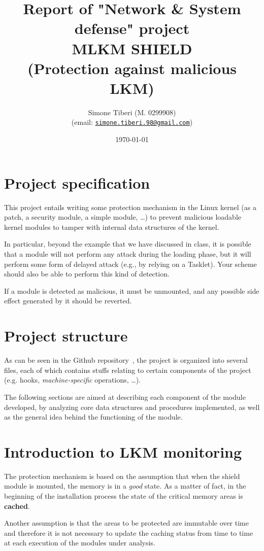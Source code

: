 \documentclass{article}
\title{\small Report of "Network \& System defense" project \\
\Huge \textbf{MLKM SHIELD}\\
\Large (Protection against malicious LKM)}
\author{Simone Tiberi (M. 0299908)\\%
(email: \texttt{\href{mailto:simone.tiberi.98@gmail.com}{simone.tiberi.98@gmail.com}})}
\date{\today}
\begin{document}
\maketitle
	\section{Project specification}
	This project entails writing some protection mechanism in the Linux kernel (as a patch, a security module, a simple
	module, \dots) to prevent malicious loadable kernel modules to tamper with internal data structures of the kernel.

	In particular, beyond the example that we have discussed in class, it is possible that a module will not perform
	any attack during the loading phase, but it will perform some form of delayed attack (e.g., by relying on a
	Tasklet). Your scheme should also be able to perform this kind of detection.

	If a module is detected as malicious, it must be unmounted, and any possible side effect generated by it should be
	reverted.

	\section{Project structure}
	As can be seen in the Github repository~\cite{github:repo}, the project is organized into several files, each of
	which contains stuffs relating to certain components of the project (e.g. hooks, \textit{machine-specific}
	operations, \dots).

	The following sections are aimed at describing each component of the module developed, by analyzing core data
	structures and procedures implemented, as well as the general idea behind the functioning of the module.

	\section{Introduction to LKM monitoring}
	The protection mechanism is based on the assumption that when the shield module is mounted, the memory is in a
	\textit{good} state. As a matter of fact, in the beginning of the installation process the state of the critical
	memory areas is \textbf{cached}.

	Another assumption is that the areas to be protected are immutable over time and therefore it is not necessary to
	update the caching status from time to time at each execution of the modules under analysis.
\end{document}

